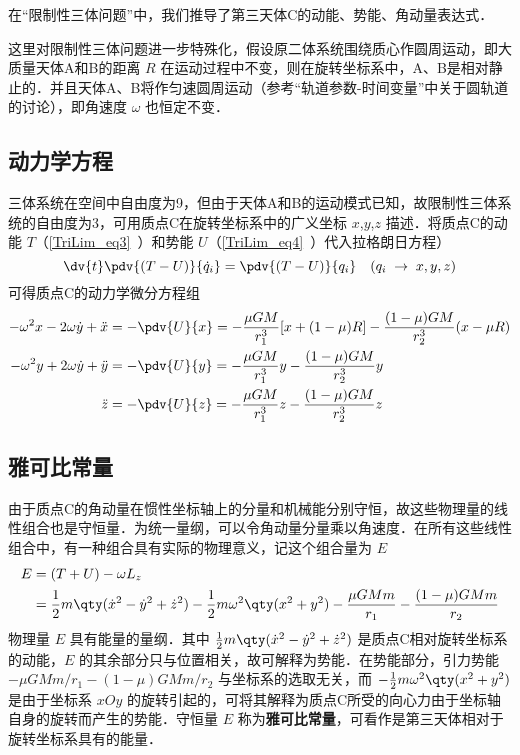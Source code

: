 

在“限制性三体问题”中，我们推导了第三天体C的动能、势能、角动量表达式．

这里对限制性三体问题进一步特殊化，假设原二体系统围绕质心作圆周运动，即大质量天体A和B的距离 $R$ 在运动过程中不变，则在旋转坐标系中，A、B是相对静止的．并且天体A、B将作匀速圆周运动（参考“轨道参数-时间变量”中关于圆轨道的讨论），即角速度 $\omega$ 也恒定不变．


\subsection{动力学方程}
三体系统在空间中自由度为9，但由于天体A和B的运动模式已知，故限制性三体系统的自由度为3，可用质点C在旋转坐标系中的广义坐标 $x$,$y$,$z$ 描述．将质点C的动能 $T$（\autoref{TriLim_eq3}~）和势能 $U$（\autoref{TriLim_eq4}~）代入拉格朗日方程）
\begin{equation}%
\dv{t} \pdv{(T-U)}{\dot q_i} = \pdv{(T-U)}{q_i}
\quad (q_i\; \rightarrow \; x,y,z)
\end{equation}
可得质点C的动力学微分方程组
\begin{align}
-\omega^2 x - 2\omega\dot{y} + \ddot{x} &=- \pdv{U}{x}=-\frac{\mu GM}{r_1^3}[x+(1-\mu)R]-\frac{(1-\mu)GM}{r_2^3}(x-\mu R)\label{JConst_eq2}\\%
-\omega^2 y +2\omega\dot{y} + \ddot{y} &=- \pdv{U}{y}=-\frac{\mu GM}{r_1^3}y-\frac{(1-\mu)GM}{r_2^3}y\label{JConst_eq3}\\%
\ddot{z} &=- \pdv{U}{z} =-\frac{\mu GM}{r_1^3}z-\frac{(1-\mu)GM}{r_2^3}z\label{JConst_eq4}%
\end{align}

\subsection{雅可比常量}
由于质点C的角动量在惯性坐标轴上的分量和机械能分别守恒，故这些物理量的线性组合也是守恒量．为统一量纲，可以令角动量分量乘以角速度．在所有这些线性组合中，有一种组合具有实际的物理意义，记这个组合量为 $E$ 
\begin{equation}%
\begin{aligned}
E &=(T+U)-\omega L_z\\
&=\frac{1}{2}m\qty(\dot{x}^2-\dot{y}^2+\dot{z}^2)-\frac{1}{2}m\omega^2\qty(x^2+y^2)-\frac{\mu GMm}{r_1}-\frac{(1-\mu)GMm}{r_2}
\end{aligned}
\end{equation}
物理量 $E$ 具有能量的量纲．其中 $\frac{1}{2}m\qty(\dot{x}^2-\dot{y}^2+\dot{z}^2)$ 是质点C相对旋转坐标系的动能，$E$ 的其余部分只与位置相关，故可解释为势能．在势能部分，引力势能 $-\mu GMm/r_1-(1-\mu)GMm/r_2$ 与坐标系的选取无关，而 $-\frac{1}{2}m\omega^2\qty(x^2+y^2)$ 是由于坐标系 $xOy$ 的旋转引起的，可将其解释为质点C所受的向心力由于坐标轴自身的旋转而产生的势能．守恒量 $E$ 称为\textbf{雅可比常量}，可看作是第三天体相对于旋转坐标系具有的能量．

